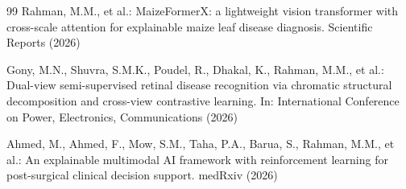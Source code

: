 \documentclass[runningheads]{llncs}
\begin{document}
\begin{thebibliography}{99}
Rahman, M.M., et al.: MaizeFormerX: a lightweight vision transformer with
cross-scale attention for explainable maize leaf disease diagnosis.
Scientific Reports (2026)

Gony, M.N., Shuvra, S.M.K., Poudel, R., Dhakal, K., Rahman, M.M., et al.:
Dual-view semi-supervised retinal disease recognition via chromatic
structural decomposition and cross-view contrastive learning. In:
International Conference on Power, Electronics, Communications (2026)

Ahmed, M., Ahmed, F., Mow, S.M., Taha, P.A., Barua, S., Rahman, M.M., et
al.: An explainable multimodal AI framework with reinforcement learning
for post-surgical clinical decision support. medRxiv (2026)

\end{thebibliography}
\end{document}

